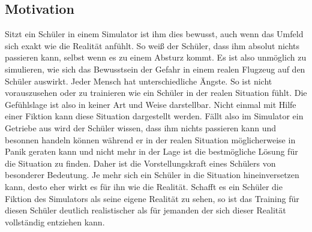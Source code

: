 \documentclass[12pt]{article}
\begin{document}
\subsection{Motivation}
Sitzt ein Schüler in einem Simulator ist ihm dies bewusst, auch wenn das Umfeld sich exakt wie die Realität anfühlt. So weiß der Schüler, dass ihm absolut nichts passieren kann, selbst wenn es zu einem Absturz kommt. Es ist also unmöglich zu simulieren, wie sich das Bewusstsein der Gefahr in einem realen Flugzeug auf den Schüler auswirkt. Jeder Mensch hat unterschiedliche Ängste. So ist nicht vorauszusehen oder zu trainieren wie ein Schüler in der realen Situation fühlt. Die Gefühlslage ist also in keiner Art und Weise darstellbar. Nicht einmal mit Hilfe einer Fiktion kann diese Situation dargestellt werden. Fällt also im Simulator ein Getriebe aus wird der Schüler wissen, dass ihm nichts passieren kann und besonnen handeln können während er in der realen Situation möglicherweise in Panik geraten kann und nicht mehr in der Lage ist die bestmögliche Lösung für die Situation zu finden.\newline
Daher ist die Vorstellungskraft eines Schülers von besonderer Bedeutung. Je mehr sich ein Schüler in die Situation hineinversetzen kann, desto eher wirkt es für ihn wie die Realität. Schafft es ein Schüler die Fiktion des Simulators als seine eigene Realität zu sehen, so ist das Training für diesen Schüler deutlich realistischer als für jemanden der sich dieser Realität vollständig entziehen kann.

%
%
\end{document}
